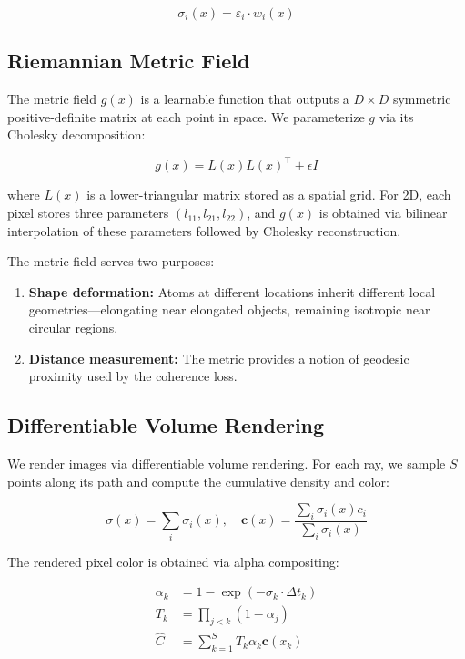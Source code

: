 \documentclass[11pt]{article}
\begin{document}
\begin{equation}
    \sigma_i(x) = \varepsilon_i \cdot w_i(x)
\end{equation}

\subsection{Riemannian Metric Field}

The metric field $g(x)$ is a learnable function that outputs a $D \times D$ symmetric positive-definite matrix at each point in space. We parameterize $g$ via its Cholesky decomposition:

\begin{equation}
    g(x) = L(x) L(x)^\top + \epsilon I
\end{equation}

where $L(x)$ is a lower-triangular matrix stored as a spatial grid. For 2D, each pixel stores three parameters $(l_{11}, l_{21}, l_{22})$, and $g(x)$ is obtained via bilinear interpolation of these parameters followed by Cholesky reconstruction.

The metric field serves two purposes:
\begin{enumerate}
    \item \textbf{Shape deformation:} Atoms at different locations inherit different local geometries---elongating near elongated objects, remaining isotropic near circular regions.
    \item \textbf{Distance measurement:} The metric provides a notion of geodesic proximity used by the coherence loss.
\end{enumerate}

\subsection{Differentiable Volume Rendering}

We render images via differentiable volume rendering. For each ray, we sample $S$ points along its path and compute the cumulative density and color:

\begin{equation}
    \sigma(x) = \sum_i \sigma_i(x), \quad \mathbf{c}(x) = \frac{\sum_i \sigma_i(x) c_i}{\sum_i \sigma_i(x)}
\end{equation}

The rendered pixel color is obtained via alpha compositing:

\begin{align}
    \alpha_k &= 1 - \exp(-\sigma_k \cdot \Delta t_k) \\
    T_k &= \prod_{j < k} (1 - \alpha_j) \\
    \hat{C} &= \sum_{k=1}^{S} T_k \alpha_k \mathbf{c}(x_k)
\end{align}
\end{document}
